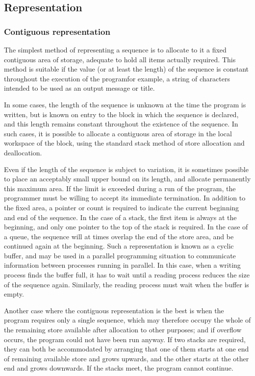 \subsection{Representation}

\subsubsection{Contiguous representation}

The simplest method of representing a sequence is to allocate to it a fixed contiguous area of storage, adequate to hold all items actually required. This method is suitable if the value (or at least the length) of the sequence is constant throughout the execution of the program\textemdash{}for example, a string of characters intended to be used as an output message or title.

In some cases, the length of the sequence is unknown at the time the program is written, but is known on entry to the block in which the sequence is declared, and this length remains constant throughout the existence of the sequence. In such cases, it is possible to allocate a contiguous area of storage in the local workspace of the block, using the standard stack method of store allocation and deallocation.

Even if the length of the sequence is subject to variation, it is sometimes possible to place an acceptably small upper bound on its length, and allocate permanently this maximum area. If the limit is exceeded during a run of the program, the programmer must be willing to accept its immediate termination. In addition to the fixed area, a pointer or count is required to indicate the current beginning and end of the sequence. In the case of a stack, the first item is always at the beginning, and only one pointer to the top of the stack is required. In the case of a queue, the sequence will at times overlap the end of the store area, and be continued again at the beginning. Such a representation is known as a cyclic buffer, and may be used in a parallel programming situation to communicate information between processes running in parallel. In this case, when a writing process finds the buffer full, it has to wait until a reading process reduces the size of the sequence again. Similarly, the reading process must wait when the buffer is empty.

Another case where the contiguous representation is the best is when the program requires only a single sequence, which may therefore occupy the whole of the remaining store available after allocation to other purposes; and if overflow occurs, the program could not have been run anyway. If two stacks are required, they can both be accommodated by arranging that one of them starts at one end of remaining available store and grows upwards, and the other starts at the other end and grows downwards. If the stacks meet, the program cannot continue.

